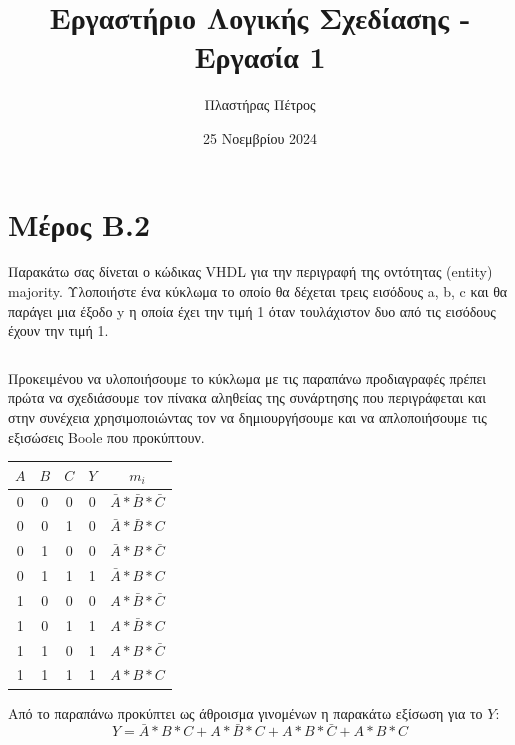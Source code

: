 \documentclass[]{article}
\begin{document}
\author{Πλαστήρας Πέτρος}
\title{Εργαστήριο Λογικής Σχεδίασης - Εργασία 1}
\date{25 Νοεμβρίου 2024}
\maketitle
\section{Μέρος Β.2}

Παρακάτω σας δίνεται ο κώδικας VHDL για την περιγραφή της
οντότητας (entity) majority. Υλοποιήστε ένα κύκλωμα το οποίο θα δέχεται τρεις
εισόδους a, b, c και θα παράγει μια έξοδο y η οποία έχει την τιμή 1 όταν τουλάχιστον
δυο από τις εισόδους έχουν την τιμή 1.
\inputminted{vhdl}{majority.vhdl}

Προκειμένου να υλοποιήσουμε το κύκλωμα με τις παραπάνω προδιαγραφές πρέπει πρώτα να
σχεδιάσουμε τον πίνακα αληθείας της συνάρτησης που περιγράφεται και στην συνέχεια
χρησιμοποιώντας τον να δημιουργήσουμε και να απλοποιήσουμε τις εξισώσεις Boole που προκύπτουν.
\begin{center}
	\begin{tabular}{ | c | c | c | c | c | }
		\hline \rule{0pt}{11pt} $A$ & $B$ & $C$ & $Y$ & $m_i$                         \\
		\hline \rule{0pt}{11pt} 0   & 0   & 0   & 0   & $\bar{A} * \bar{B} * \bar{C}$ \\
		\rule{0pt}{11pt} 0          & 0   & 1   & 0   & $\bar{A} * \bar{B} * C$       \\
		\rule{0pt}{11pt} 0          & 1   & 0   & 0   & $\bar{A} * B * \bar{C}$       \\
		\rule{0pt}{11pt} 0          & 1   & 1   & 1   & $\bar{A} * B * C$             \\
		\rule{0pt}{11pt} 1          & 0   & 0   & 0   & $A * \bar{B} * \bar{C}$       \\
		\rule{0pt}{11pt} 1          & 0   & 1   & 1   & $A * \bar{B} * C$             \\
		\rule{0pt}{11pt} 1          & 1   & 0   & 1   & $A * B * \bar{C}$             \\
		\rule{0pt}{11pt} 1          & 1   & 1   & 1   & $A * B * C$                   \\
		\hline
	\end{tabular}
\end{center}

Από το παραπάνω προκύπτει ως άθροισμα γινομένων η παρακάτω εξίσωση για το $Y$:
$$ Y = \bar{A} * B * C + A * \bar{B} * C + A * B * \bar{C} + A * B * C$$
\end{document}
